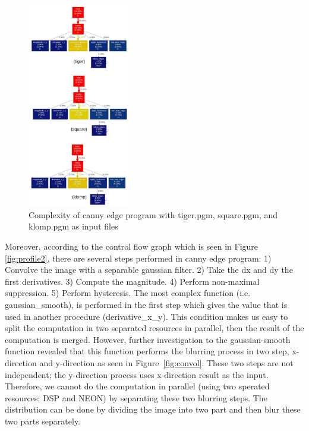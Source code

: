\documentclass[conference]{IEEEtran}
\begin{document}
\begin{figure}[!ht]
\centering
\includegraphics[width=0.4\textwidth]{pic/mix3.png}
\caption{Complexity of canny edge program with tiger.pgm, square.pgm, and klomp.pgm as input files}
\label{fig:profile}
\end{figure} 

Moreover, according to the control flow graph which is seen in Figure \ref{fig:profile2}, there are several steps performed in canny edge program: 1) Convolve the image with a separable gaussian filter. 2) Take the dx and dy the first derivatives. 3) Compute the magnitude. 4) Perform non-maximal suppression. 5) Perform hysteresis. The most complex function (i.e. gaussian\_smooth), is performed in the first step which gives the value that is used in another procedure (derivative\_x\_y). This condition makes us easy to split the computation in two separated resources in parallel, then the result of the computation is merged. However, further investigation to the gaussian-smooth function revealed that this function performs the blurring process in two step, x-direction and y-direction as seen in Figure~\ref{fig:convol}. These two steps are not independent; the y-direction process uses x-direction result as the input. Therefore, we cannot do the computation in parallel (using two sperated resources: DSP and NEON) by separating these two blurring steps. The distribution can be done by dividing the image into two part and then blur these two parts separately. 
\end{document}
